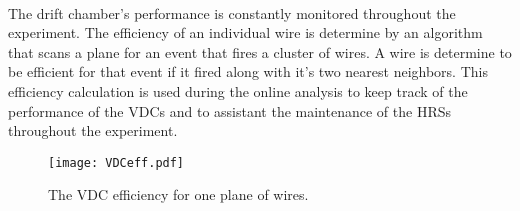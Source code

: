	\paragraph{}The drift chamber's performance is constantly monitored throughout the experiment. The efficiency of an individual wire is determine by an algorithm that scans a plane for an event that fires a cluster of wires. A wire is determine to be efficient for that event if it fired along with it's two nearest neighbors. This efficiency calculation is used during the online analysis to keep track of the performance of the VDCs and to assistant the maintenance of the HRSs throughout the experiment. 
	\begin{figure}
		\centering
		\texttt{[image: VDCeff.pdf]}
		\caption{The VDC efficiency for one plane of wires.}
		\label{vdceff}
	\end{figure}
